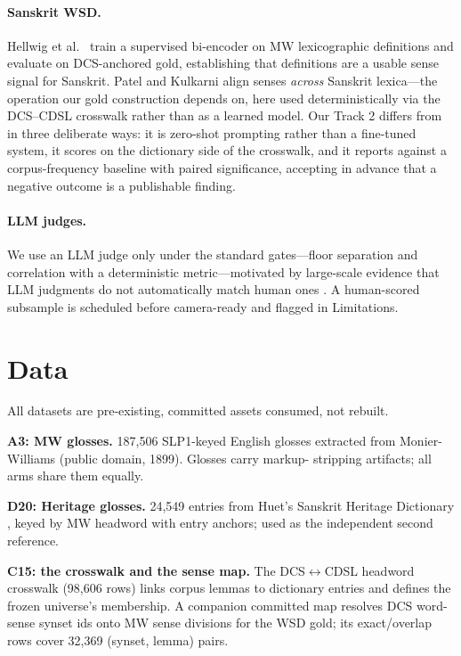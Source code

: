 \documentclass[11pt]{article}
\begin{document}
\paragraph{Sanskrit WSD.} Hellwig et al.\ \cite{hellwig-etal-2026-sanskrit} train a
supervised bi-encoder on MW lexicographic definitions and evaluate on DCS-anchored gold,
establishing that definitions are a usable sense signal for Sanskrit. Patel and Kulkarni
\cite{patel-kulkarni-2024-word} align senses \emph{across} Sanskrit lexica---the
operation our gold construction depends on, here used deterministically via the
DCS--CDSL crosswalk rather than as a learned model. Our Track 2 differs from
\cite{hellwig-etal-2026-sanskrit} in three deliberate ways: it is zero-shot prompting
rather than a fine-tuned system, it scores on the dictionary side of the crosswalk, and
it reports against a corpus-frequency baseline with paired significance, accepting in
advance that a negative outcome is a publishable finding.

\paragraph{LLM judges.} We use an LLM judge only under the standard gates---floor
separation and correlation with a deterministic metric---motivated by large-scale
evidence that LLM judgments do not automatically match human ones
\cite{bavaresco-etal-2025-llms}. A human-scored subsample is scheduled before
camera-ready and flagged in Limitations.

\section{Data}

All datasets are pre-existing, committed assets consumed, not rebuilt.

\textbf{A3: MW glosses.} 187{,}506 SLP1-keyed English glosses extracted from Monier-
Williams \cite{monier-williams-1899} (public domain, 1899). Glosses carry markup-
stripping artifacts; all arms share them equally.

\textbf{D20: Heritage glosses.} 24{,}549 entries from Huet's Sanskrit Heritage Dictionary
\cite{huet-2026-heritage}, keyed by MW headword with entry anchors; used as the
independent second reference.

\textbf{C15: the crosswalk and the sense map.} The DCS$\leftrightarrow$CDSL headword
crosswalk (98{,}606 rows) links corpus lemmas to dictionary entries and defines the
frozen universe's membership. A companion committed map resolves DCS word-sense synset
ids onto MW sense divisions for the WSD gold; its exact/overlap rows cover 32{,}369
(synset, lemma) pairs.
\end{document}
